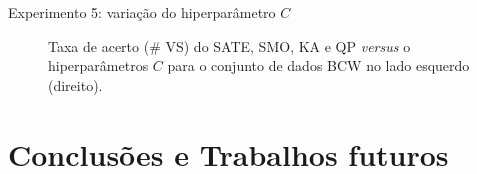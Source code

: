 \documentclass{beamer}
\begin{document}
\begin{frame}[noframenumbering]{Experimento 5: variação do hiperparâmetro $C$}
\begin{figure}[!htbp]
    \centering

    \begin{subfigure}[b]{0.48\textwidth}
        \caption{}
    \end{subfigure}
    \begin{subfigure}[b]{0.48\textwidth}
        \caption{}
    \end{subfigure}
   
   
    
    \caption{Taxa de acerto (\# VS) do SATE, SMO, KA e QP \textit{versus} o hiperparâmetros $C$ para o conjunto de dados BCW no lado esquerdo (direito).}\label{fig:accuracy_C1} 
\end{figure}
\end{frame}


\section{Conclusões e Trabalhos futuros}
\end{document}
